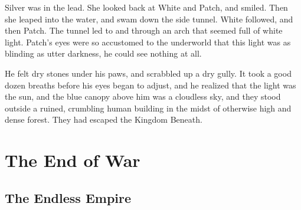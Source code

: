 \documentclass[12pt]{book}
\begin{document}
 Silver was in the lead. She looked back at White and Patch, and smiled. Then she leaped into the water, and swam down the side tunnel. White followed, and then Patch. The tunnel led to and through an arch that seemed full of white light. Patch's eyes were so accustomed to the underworld that this light was as blinding as utter darkness, he could see nothing at all.\par
He felt dry stones under his paws, and scrabbled up a dry gully. It took a good dozen breaths before his eyes began to adjust, and he realized that the light was the sun, and the blue canopy above him was a cloudless sky, and they stood outside a ruined, crumbling human building in the midst of otherwise high and dense forest. They had escaped the Kingdom Beneath.\par

\chapter{The End of War}

\section{The Endless Empire}
\end{document}
